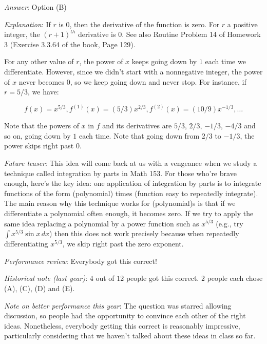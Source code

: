 \documentclass[10pt]{amsart}
\begin{document}
\begin{enumerate}
  {\em Answer}: Option (B)

  {\em Explanation}: If $r$ is $0$, then the derivative of the
  function is zero. For $r$ a positive integer, the $(r + 1)^{th}$
  derivative is $0$. See also Routine Problem 14 of Homework 3
  (Exercise 3.3.64 of the book, Page 129).

  For any other value of $r$, the power of $x$ keeps going down by $1$
  each time we differentiate. However, since we didn't start with a
  nonnegative integer, the power of $x$ never becomes $0$, so we keep
  going down and never stop. For instance, if $r = 5/3$, we have:

  $$f(x) = x^{5/3}, f^{(1)}(x) = (5/3)x^{2/3}, f^{(2)}(x) = (10/9)x^{-1/3}, \dots$$
  
  Note that the powers of $x$ in $f$ and its derivatives are $5/3$,
  $2/3$, $-1/3$, $-4/3$ and so on, going down by $1$ each time. Note
  that going down from $2/3$ to $-1/3$, the power skips right past
  $0$.
 
  {\em Future teaser}: This idea will come back at us with a vengeance
  when we study a technique called integration by parts in Math
  153. For those who're brave enough, here's the key idea: one
  application of integration by parts is to integrate functions of the
  form (polynomial) times (function easy to repeatedly integrate). The
  main reason why this technique works for (polynomial)s is that if we
  differentiate a polynomial often enough, it becomes zero. If we try
  to apply the same idea replacing a polynomial by a power function
  such as $x^{5/3}$ (e.g., try $\int x^{5/3}\sin x \, dx$) then this
  does not work precisely because when repeatedly differentiating
  $x^{5/3}$, we skip right past the zero exponent.

  {\em Performance review}: Everybody got this correct!

  {\em Historical note (last year)}: $4$ out of $12$ people got this
  correct. $2$ people each chose (A), (C), (D) and (E).

  {\em Note on better performance this year}: The question was starred
  allowing discussion, so people had the opportunity to convince each
  other of the right ideas. Nonetheless, everybody getting this
  correct is reasonably impressive, particularly considering that we
  haven't talked about these ideas in class so far.
\end{enumerate}
\end{document}
